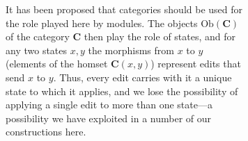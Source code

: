 \begin{figure}
\begin{figure}
\iflater
{} 

\fi

\ifdelta
\iffull
{}
\label{cats}
\iflater{}\fi{}It has been proposed 
\cite{Diskin-Delta11,Johnson11} that categories should be used for
the role played here by modules. The objects $\text{Ob}(\mathbf{C})$ of the
category $\mathbf{C}$ then play the role of states, and for any two states $x,y$ the
morphisms from $x$ to $y$ (elements of the homset $\mathbf{C}(x,y)$)
represent edits that send $x$ to $y$. Thus, every edit carries with it
a unique state to which it applies,
and we lose the possibility of applying a single edit to more than
one state---a possibility we have exploited in a number of our
constructions here.



\end{figure}
\end{figure}
